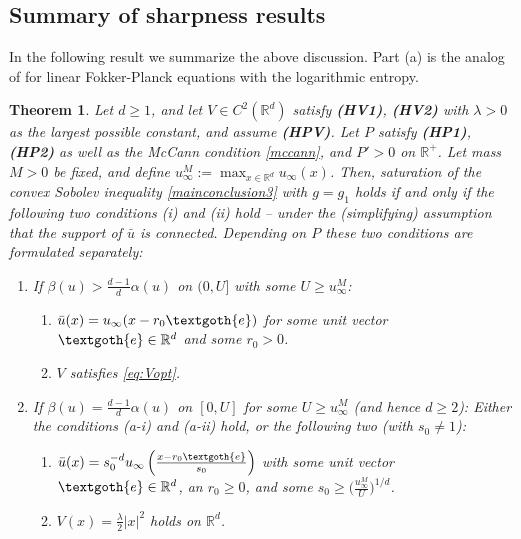 \documentclass[reqno]{amsart}
\newtheorem{theorem}[lemma]{Theorem}
\newcommand{\R}{\mathbb{R}}
\begin{document}
%

\subsection{Summary of sharpness results}
%
In the following result we summarize the above discussion. Part (a) is the analog of \cite[Theorem 3.11]{AMTU} for linear Fokker-Planck equations with the logarithmic entropy.

\begin{theorem}\label{th:sharp}
Let $d\ge1$, and let $V\in C^2(\R^d)$ satisfy {\bf (HV1)},  {\bf (HV2)} with $\lambda>0$ as the largest possible constant, and assume {\bf (HPV)}. Let $P$ satisfy {\bf (HP1)},  {\bf (HP2)} as well as the McCann condition \eqref{mccann}, and $P'>0$ on $\R^+$. Let mass $M>0$ be fixed, and define $u_\infty^M:=\max_{x\in\R^d} u_\infty(x)$. Then, saturation of the convex Sobolev inequality \eqref{mainconclusion3} with $g=g_1$ holds if and only if the following two conditions (i) and (ii) hold -- under the (simplifying) assumption that the support of $\bar u$ is connected. Depending on $P$ these two conditions are formulated separately:
\begin{enumerate}
    \item[(a)] If $\beta(u)>\frac{d-1}{d}\alpha(u)$ on $(0,U]$ with some $U\ge u_\infty^M$:
    \begin{enumerate}
        \item[(i)] $\bar u(x)=u_\infty(x-r_0\textgoth{e})$ for some unit vector $\textgoth{e}\in\R^d$ and some $r_0>0$.
        \item[(ii)] $V$ satisfies \eqref{eq:Vopt}.
    \end{enumerate}
    \item[(b)] If $\beta(u)=\frac{d-1}{d}\alpha(u)$ on $[0,U]$ for some $U\ge u_\infty^M$ (and hence $d\ge2$):
     Either the conditions (a-i) and (a-ii) hold, or the following two (with $s_0\ne1$):
    \begin{enumerate}
        \item[(i)] $\bar u(x)=s_0^{-d}u_\infty\left(\frac{x-r_0\textgoth{e}}{s_0}\right)$ with some unit vector $\textgoth{e}\in\R^d$, an $r_0\ge0$, and some $s_0\ge \Big(\frac{u_\infty^M}{U}\Big)^{1/d}$. 
        \item[(ii)] $V(x)=\frac{\lambda}{2}|x|^2$ holds on $\R^d$.
    \end{enumerate}
\end{enumerate}
\end{theorem}
\end{document}
